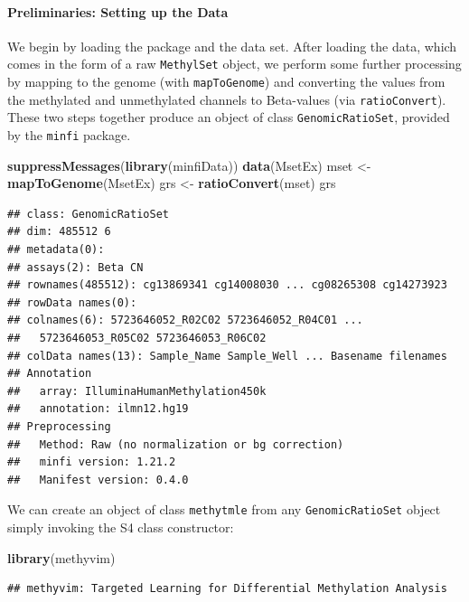 \documentclass[9pt,a4paper,]{extarticle}
\newenvironment{Shaded}{\begin{snugshade}}{\end{snugshade}}
\newcommand{\KeywordTok}[1]{\textcolor[rgb]{0.13,0.29,0.53}{\textbf{#1}}}
\newcommand{\StringTok}[1]{\textcolor[rgb]{0.31,0.60,0.02}{#1}}
\newcommand{\NormalTok}[1]{#1}
\theoremstyle{definition}
\theoremstyle{definition}
\theoremstyle{definition}
\theoremstyle{remark}
\begin{document}
\paragraph{Preliminaries: Setting up the
Data}\label{preliminaries-setting-up-the-data}

We begin by loading the package and the data set. After loading the
data, which comes in the form of a raw \texttt{MethylSet} object, we
perform some further processing by mapping to the genome (with
\texttt{mapToGenome}) and converting the values from the methylated and
unmethylated channels to Beta-values (via \texttt{ratioConvert}). These
two steps together produce an object of class \texttt{GenomicRatioSet},
provided by the \texttt{minfi} package.

\begin{Shaded}
\begin{Highlighting}[]
\KeywordTok{suppressMessages}\NormalTok{(}\KeywordTok{library}\NormalTok{(minfiData))}
\KeywordTok{data}\NormalTok{(MsetEx)}
\NormalTok{mset <-}\StringTok{ }\KeywordTok{mapToGenome}\NormalTok{(MsetEx)}
\NormalTok{grs <-}\StringTok{ }\KeywordTok{ratioConvert}\NormalTok{(mset)}
\NormalTok{grs}
\end{Highlighting}
\end{Shaded}

\begin{verbatim}
## class: GenomicRatioSet 
## dim: 485512 6 
## metadata(0):
## assays(2): Beta CN
## rownames(485512): cg13869341 cg14008030 ... cg08265308 cg14273923
## rowData names(0):
## colnames(6): 5723646052_R02C02 5723646052_R04C01 ...
##   5723646053_R05C02 5723646053_R06C02
## colData names(13): Sample_Name Sample_Well ... Basename filenames
## Annotation
##   array: IlluminaHumanMethylation450k
##   annotation: ilmn12.hg19
## Preprocessing
##   Method: Raw (no normalization or bg correction)
##   minfi version: 1.21.2
##   Manifest version: 0.4.0
\end{verbatim}

We can create an object of class \texttt{methytmle} from any
\texttt{GenomicRatioSet} object simply invoking the S4 class
constructor:

\begin{Shaded}
\begin{Highlighting}[]
\KeywordTok{library}\NormalTok{(methyvim)}
\end{Highlighting}
\end{Shaded}

\begin{verbatim}
## methyvim: Targeted Learning for Differential Methylation Analysis
\end{verbatim}
\end{document}
